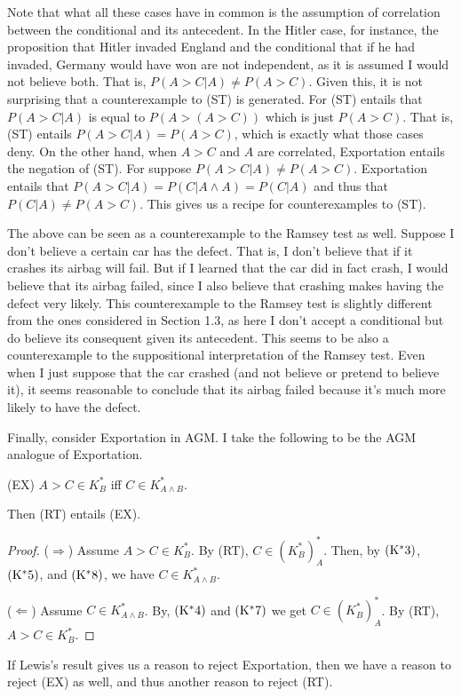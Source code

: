 \documentclass[12pt]{article}
\begin{document}
Note that what all these cases have in common is the assumption of correlation between the conditional and its antecedent. In the Hitler case, for instance, the proposition that Hitler invaded England and the conditional that if he had invaded, Germany would have won are not independent, as it is assumed I would not believe both. That is, $P(A>C|A)\neq P(A>C)$. Given this, it is not surprising that a counterexample to (ST) is generated. For (ST) entails that $P(A>C|A)$ is equal to $P(A>(A>C))$ which is just $P(A>C)$. That is, (ST) entails $P(A>C|A) = P(A>C)$, which is exactly what those cases deny. On the other hand, when $A>C$ and $A$ are correlated, Exportation entails the negation of (ST). For suppose $P(A>C|A) \neq P(A>C)$. Exportation entails that $P(A>C|A)=P(C|A\land A)=P(C|A)$ and thus that $P(C|A) \neq P(A>C)$. This gives us a recipe for counterexamples to (ST).

The above can be seen as a counterexample to the Ramsey test as well. Suppose I don't believe a certain car has the defect. That is, I don't believe that if it crashes its airbag will fail. But if I learned that the car did in fact crash, I would believe that its airbag failed, since I also believe that crashing makes having the defect very likely. This counterexample to the Ramsey test is slightly different from the ones considered in Section 1.3, as here I don't accept a conditional but do believe its consequent given its antecedent. This seems to be also a counterexample to the suppositional interpretation of the Ramsey test. Even when I just suppose that the car crashed (and not believe or pretend to believe it), it seems reasonable to conclude that its airbag failed because it's much more likely to have the defect.

Finally, consider Exportation in AGM. I take the following to be the AGM analogue of Exportation.

(EX) $A>C \in K_B^*$ iff $C \in K_{A\land B}^*$.

Then (RT) entails (EX).

\begin{proof}

($\Rightarrow$) Assume $A>C \in K_B^*$. By (RT), $C\in (K_B^*)_A^*$. Then, by $\pst{*3}$, $\pst{*5}$, and $\pst{*8}$, we have $C\in K_{A\land B}^*$.

($\Leftarrow$) Assume $C \in K_{A\land B}^*$. By, $\pst{*4}$ and $\pst{*7}$ we get $C \in (K_B^*)_A^*$. By (RT), $A>C \in K_B^*$.
\end{proof}

If Lewis's result gives us a reason to reject Exportation, then we have a reason to reject (EX) as well, and thus another reason to reject (RT).
\end{document}
